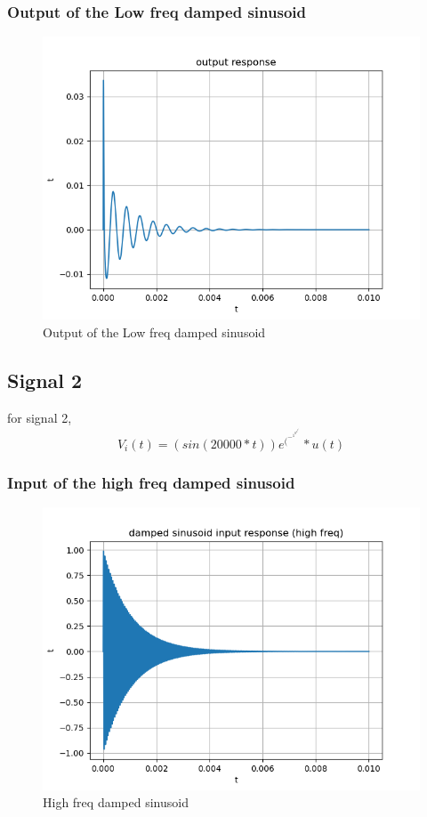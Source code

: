 \documentclass[11pt]{article}
\begin{document}
\subsubsection{Output of the Low freq damped sinusoid}
\begin{figure}[H]
    \centering
    \includegraphics[scale = 1]{Figure_7.png}
    \caption{Output of the Low freq damped sinusoid}
\end{figure}


\subsection{Signal 2}
for signal 2, 
\begin{equation}
    V_i(t) = (sin(20000*t))e^(^-^1^0^0^0^*^t^) * u(t)
\end{equation}

\subsubsection{Input of the high freq damped sinusoid}
\begin{figure}[H]
    \centering
    \includegraphics[scale = 1]{Figure_8.png}
    \caption{High freq damped sinusoid}
\end{figure}
\end{document}
